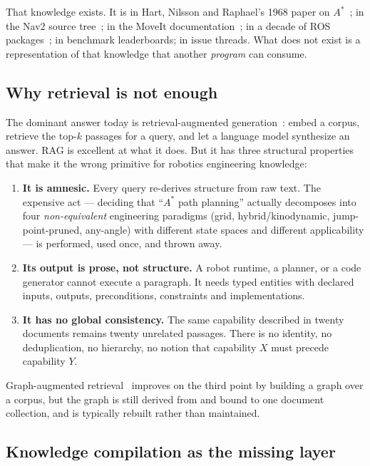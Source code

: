 \documentclass[10pt,a4paper]{article}
\begin{document}
That knowledge exists. It is in Hart, Nilsson and Raphael's 1968 paper on
$A^\ast$~\cite{hart1968astar}; in the Nav2 source tree~\cite{macenski2020marathon};
in the MoveIt documentation~\cite{coleman2014moveit}; in a decade of ROS
packages~\cite{quigley2009ros}; in benchmark leaderboards; in issue threads. What
does not exist is a representation of that knowledge that another \emph{program}
can consume.

\subsection{Why retrieval is not enough}

The dominant answer today is retrieval-augmented generation~\cite{lewis2020rag,gao2023ragsurvey}:
embed a corpus, retrieve the top-$k$ passages for a query, and let a language
model synthesize an answer. RAG is excellent at what it does. But it has three
structural properties that make it the wrong primitive for robotics engineering
knowledge:

\begin{enumerate}[leftmargin=1.4em,itemsep=2pt]
\item \textbf{It is amnesic.} Every query re-derives structure from raw text.
  The expensive act --- deciding that ``$A^\ast$ path planning'' actually
  decomposes into four \emph{non-equivalent} engineering paradigms (grid,
  hybrid/kinodynamic, jump-point-pruned, any-angle) with different state spaces
  and different applicability --- is performed, used once, and thrown away.
\item \textbf{Its output is prose, not structure.} A robot runtime, a planner, or
  a code generator cannot execute a paragraph. It needs typed entities with
  declared inputs, outputs, preconditions, constraints and implementations.
\item \textbf{It has no global consistency.} The same capability described in
  twenty documents remains twenty unrelated passages. There is no identity, no
  deduplication, no hierarchy, no notion that capability $X$ must precede
  capability $Y$.
\end{enumerate}

Graph-augmented retrieval~\cite{edge2024graphrag} improves on the third point by
building a graph over a corpus, but the graph is still derived from and bound to
one document collection, and is typically rebuilt rather than maintained.

\subsection{Knowledge compilation as the missing layer}
\end{document}
